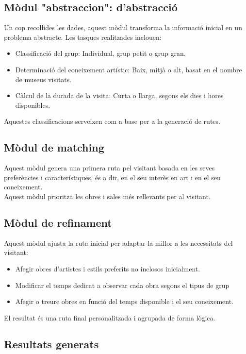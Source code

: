 \documentclass[a4paper]{article}
\begin{document}
	
	\subsection{Mòdul "abstraccion": d’abstracció}
	
	Un cop recollides les dades, aquest mòdul transforma la informació inicial en un problema abstracte. Les tasques realitzades inclouen:
	\begin{itemize}
		\item Classificació del grup: Individual, grup petit o grup gran.
		\item Determinació del coneixement artístic: Baix, mitjà o alt, basat en el nombre de museus visitats.
		\item Càlcul de la durada de la visita: Curta o llarga, segons els dies i hores disponibles.
	\end{itemize}
	Aquestes classificacions serveixen com a base per a la generació de rutes.
	
	\subsection{Mòdul de matching}
	
	Aquest mòdul genera una primera ruta pel visitant basada en les seves preferències i característiques, és a dir, en el seu interès en art i en el seu coneixement. \\
	
	Aquest mòdul prioritza les obres i sales més rellevants per al visitant.
	
	\subsection{Mòdul de refinament}
	
	Aquest mòdul ajusta la ruta inicial per adaptar-la millor a les necessitats del visitant:
	\begin{itemize}
		\item Afegir obres d'artistes i estils preferits no inclosos inicialment.
		\item Modificar el temps dedicat a observar cada obra segons el tipus de grup 
		\item Afegir o treure obres en funció del temps disponible i el seu coneixement.
		
	\end{itemize}
	El resultat és una ruta final personalitzada i agrupada de forma lògica.
	
	\subsection{Resultats generats}
	
\end{document}
